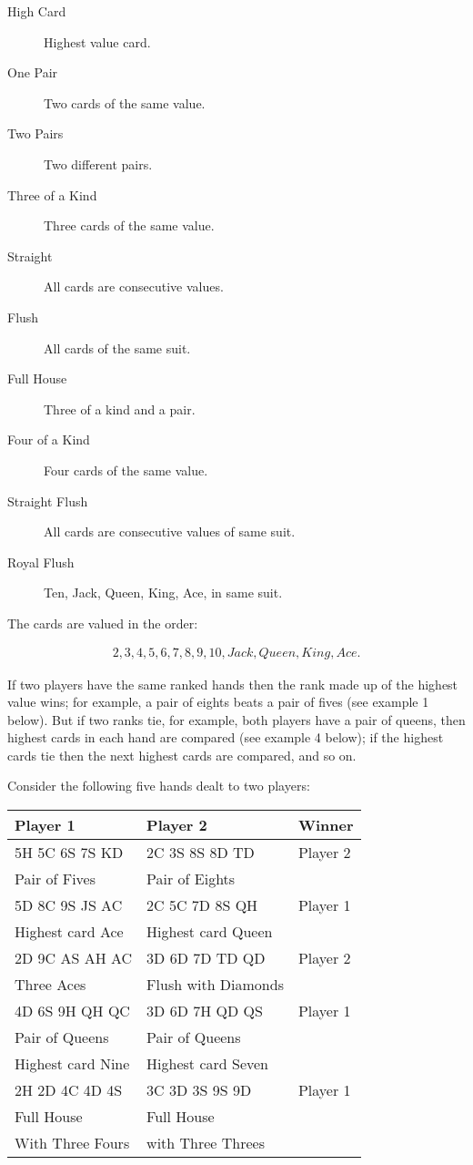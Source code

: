 \documentclass[11pt]{article}
\begin{document}
\begin{description}
\item[{High Card}] Highest value card.
\item[{One Pair}] Two cards of the same value.
\item[{Two Pairs}] Two different pairs.
\item[{Three of a Kind}] Three cards of the same value.
\item[{Straight}] All cards are consecutive values.
\item[{Flush}] All cards of the same suit.
\item[{Full House}] Three of a kind and a pair.
\item[{Four of a Kind}] Four cards of the same value.
\item[{Straight Flush}] All cards are consecutive values of same suit.
\item[{Royal Flush}] Ten, Jack, Queen, King, Ace, in same suit.
\end{description}

The cards are valued in the order:

\begin{align*}
  2, 3, 4, 5, 6, 7, 8, 9, 10, Jack, Queen, King, Ace.
\end{align*}


If two players have the same ranked hands then the rank made up of the
highest value wins; for example, a pair of eights beats a pair of fives (see
example 1 below). But if two ranks tie, for example, both players have a
pair of queens, then highest cards in each hand are compared (see example 4
below); if the highest cards tie then the next highest cards are compared,
and so on.

Consider the following five hands dealt to two players:

\begin{center}
\begin{tabular}{lll}
Player 1 & Player 2 & Winner\\
\hline
5H 5C 6S 7S KD & 2C 3S 8S 8D TD & Player 2\\
Pair of Fives & Pair of Eights & \\
\hline
5D 8C 9S JS AC & 2C 5C 7D 8S QH & Player 1\\
Highest card Ace & Highest card Queen & \\
\hline
2D 9C AS AH AC & 3D 6D 7D TD QD & Player 2\\
Three Aces & Flush with Diamonds & \\
\hline
4D 6S 9H QH QC & 3D 6D 7H QD QS & Player 1\\
Pair of Queens & Pair of Queens & \\
Highest card Nine & Highest card Seven & \\
\hline
2H 2D 4C 4D 4S & 3C 3D 3S 9S 9D & Player 1\\
Full House & Full House & \\
With Three Fours & with Three Threes & \\
\end{tabular}
\end{center}
\end{document}
